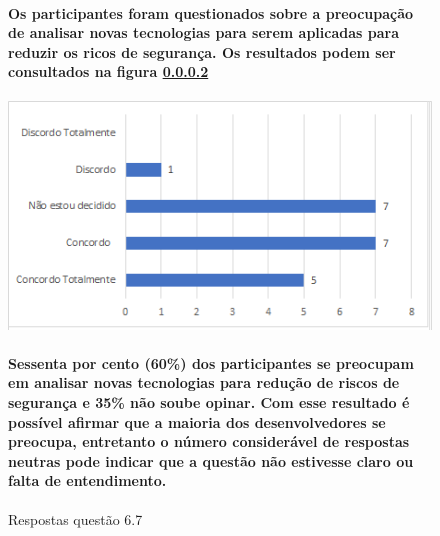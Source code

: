 \begin{figure}[!t]
\centering
\paragraph{Os participantes foram questionados sobre a preocupação de analisar novas tecnologias para serem aplicadas para reduzir os ricos de segurança. Os resultados podem ser consultados na figura \ref{fig:6.7}}
\includegraphics[scale=0.7]{figuras das questoes/6.7.png}
\caption{Respostas questão 6.7}
\paragraph{Sessenta por cento (60{\%}) dos participantes se preocupam em analisar novas tecnologias para redução de riscos de segurança e 35{\%} não soube opinar. Com esse resultado é possível afirmar que a maioria dos desenvolvedores se preocupa, entretanto o número considerável de respostas neutras pode indicar que a questão não estivesse claro ou falta de entendimento.}
\label{fig:6.7}
\end{figure}
